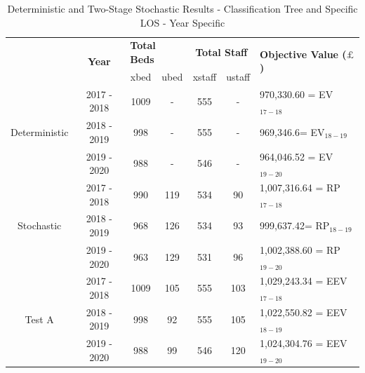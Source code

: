 \documentclass[../thesis.tex]{subfiles}
\begin{document}
\begin{table}[h!]
    \centering
    \begin{tabular}{ccccccl}\toprule
 & \multirow{2}{*}{\textbf{Year}}& \multicolumn{2}{l}{\textbf{Total Beds}} & \multicolumn{2}{c}{\textbf{Total Staff}} & \multirow{2}{*}{\textbf{Objective Value ($\pounds$)}}\\ \cmidrule(lr){3-4} \cmidrule(lr){5-6}
&& xbed           & ubed          & xstaff         & ustaff         \\ \midrule
     \multirow{3}{*}{Deterministic} & 2017 - 2018 & 1009 & - & 555 & - & 970,330.60 = EV$_{17-18}$ \\ 
      & 2018 - 2019 & 998 & - & 555 & - & 969,346.6= EV$_{18-19}$ \\
      & 2019 - 2020 & 988 & - & 546 & - & 964,046.52 = EV$_{19-20}$\\\midrule
     \multirow{3}{*}{Stochastic} & 2017 - 2018 &990& 119  & 534 & 90 &1,007,316.64 = RP$_{17-18}$ \\ 
      & 2018 - 2019 & 968 &126 & 534&93& 999,637.42= RP$_{18-19}$ \\
      & 2019 - 2020 & 963& 129&531 & 96 & 1,002,388.60 = RP$_{19-20}$\\ \midrule
      \multirow{3}{*}{Test A}& 2017 - 2018 & 1009& 105  & 555 & 103 & 1,029,243.34 = EEV$_{17-18}$\\
      & 2018 - 2019 & 998 & 92& 555 &105&1,022,550.82 = EEV$_{18-19}$\\
      & 2019 - 2020 & 988 & 99 & 546 & 120 &1,024,304.76 = EEV$_{19-20}$\\\bottomrule      
    \end{tabular}
    \caption{Deterministic and Two-Stage Stochastic Results - Classification Tree and Specific LOS - Year Specific}
    \label{tab:Results5}
\end{table}



\end{document}

